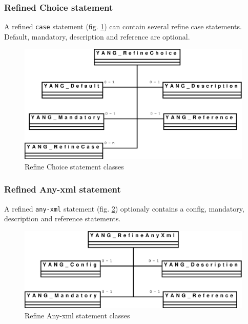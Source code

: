 \documentclass[a4paper]{article}
\begin{document}
\subsubsection{Refined Choice statement}

A refined {\tt case}  statement (fig.  \ref{refinechoice}) can contain
several  refine case statements.  Default, mandatory,  description and
reference are optional.
\begin{figure}[htbp]
\begin{center}
\includegraphics[scale = .3]{refinechoice.eps}
\end{center}
\caption{Refine Choice statement classes}
\label{refinechoice}
\end{figure}

\subsubsection{Refined Any-xml statement}

A refined {\tt any-xml} statement (fig.  \ref{refineanyxml}) optionaly
contains a config, mandatory, description and reference statements.
\begin{figure}[htbp]
\begin{center}
\includegraphics[scale = .3]{refineanyxml.eps}
\end{center}
\caption{Refine Any-xml statement classes}
\label{refineanyxml}
\end{figure}
\end{document}
